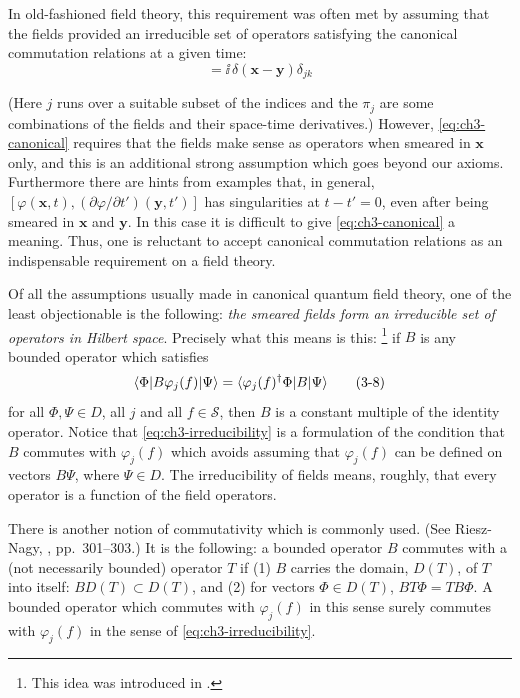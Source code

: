 In old-fashioned field theory, this requirement was often met by assuming
that the fields provided an irreducible set of operators satisfying the
canonical commutation relations at a given time:
\begin{equation}
  [\varphi_j(\mathbf{x},t),\pi_k(\mathbf{y},t)]
  =\ii\,\delta(\mathbf{x}-\mathbf{y})\delta_{jk}
  \tag{3-7}\label{eq:ch3-canonical}
\end{equation}

(Here $j$ runs over a suitable subset of the indices and the $\pi_j$ are
some combinations of the fields and their space-time derivatives.) However,
\eqref{eq:ch3-canonical} requires that the fields make sense as operators when smeared in
$\mathbf{x}$ only, and this is an additional strong assumption which goes
beyond our axioms. Furthermore there are hints from examples that, in
general, $[\varphi(\mathbf{x},t),
(\partial\varphi/\partial t')(\mathbf{y},t')]$ has singularities at
$t-t'=0$, even after being smeared in $\mathbf{x}$ and $\mathbf{y}$. In this
case it is difficult to give \eqref{eq:ch3-canonical} a meaning. Thus, one is reluctant to
accept canonical commutation relations as an indispensable requirement on a
field theory.

Of all the assumptions usually made in canonical quantum field theory, one
of the least objectionable is the following: \emph{the smeared fields form an
irreducible set of operators in Hilbert space}. Precisely what this means is
this:
\begingroup
\renewcommand{\thefootnote}{$\dagger$}%
\footnote{This idea was introduced in \cite{pct-ch3-5}.}%
\endgroup
if $B$ is any bounded operator which satisfies
\begin{equation}
  \langle \Phi\rvert B\varphi_j(f)\lvert \Psi\rangle
  =\langle \varphi_j(f)^\dagger\Phi\rvert B\lvert \Psi\rangle
  \tag{3-8}\label{eq:ch3-irreducibility}
\end{equation}
for all $\Phi,\Psi\in D$, all $j$ and all $f\in\mathcal{S}$, then $B$ is a
constant multiple of the identity operator. Notice that \eqref{eq:ch3-irreducibility} is a
formulation of the condition that $B$ commutes with $\varphi_j(f)$ which
avoids assuming that $\varphi_j(f)$ can be defined on vectors $B\Psi$, where
$\Psi\in D$. The irreducibility of fields means, roughly, that every operator
is a function of the field operators.

There is another notion of commutativity which is commonly used. (See
Riesz-Nagy, \cite{pct-25}, pp.~301--303.) It is the following: a
bounded operator $B$ commutes with a (not necessarily bounded) operator $T$ if
(1) $B$ carries the domain, $D(T)$, of $T$ into itself:
$BD(T)\subset D(T)$, and (2) for vectors $\Phi\in D(T)$,
$BT\Phi=TB\Phi$. A bounded operator which commutes with $\varphi_j(f)$ in
this sense surely commutes with $\varphi_j(f)$ in the sense of \eqref{eq:ch3-irreducibility}.

